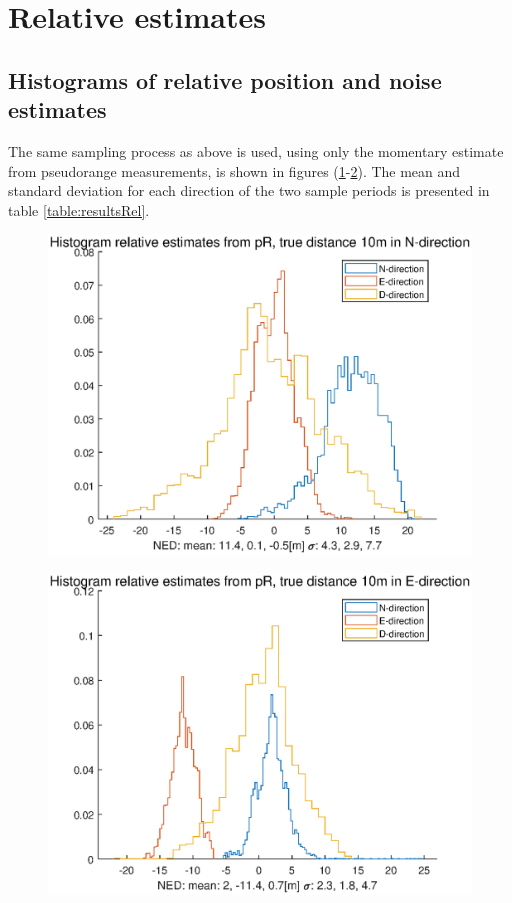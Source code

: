 \section{Relative estimates}
\subsection{Histograms of relative position and noise estimates}\label{histogramDD}
The same sampling process as above is used, using only the momentary estimate from pseudorange measurements, is shown in figures (\ref{fig:histRel1hN}-\ref{fig:histRel1hE}). The mean and standard deviation for each direction of the two sample periods is presented in table \ref{table:resultsRel}.
\begin{figure}[H]
\includegraphics[width=\textwidth]{Results/histRel30MinN}
\caption{\label{fig:histRel1hN}}
\end{figure}
\begin{figure}
\includegraphics[width=\textwidth]{Results/histRel30MinE}
\caption{\label{fig:histRel1hE}}
\end{figure}

